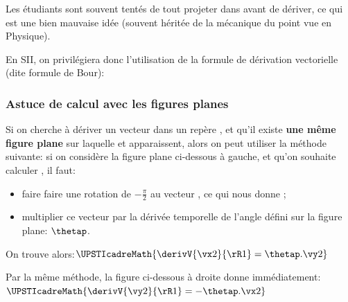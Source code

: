 \documentclass[11pt]{article}
\begin{document}
Les étudiants sont souvent tentés de tout projeter dans  avant de dériver, ce qui est une bien mauvaise idée (souvent héritée de la mécanique du point vue en Physique).

En SII, on privilégiera donc l'utilisation de la formule de dérivation vectorielle (dite \og formule de Bour\fg{}):


\subsubsection{Astuce de calcul avec les figures planes}
Si on cherche à dériver un vecteur  dans un repère , et qu'il existe \textbf{une même figure plane} sur laquelle  et  apparaissent, alors on peut utiliser la méthode suivante: si on considère la figure plane ci-dessous à gauche, et qu'on souhaite calculer , il faut:
\begin{itemize}
\item faire faire une rotation de $-\frac{\pi}{2}$ au vecteur , ce qui nous donne ;
\item multiplier ce vecteur par la dérivée temporelle de l'angle défini sur la figure plane: $\thetap$.
\end{itemize}

On trouve alors:\quad $\UPSTIcadreMath{\derivV{\vx2}{\rR1}=\thetap.\vy2}$

Par la même méthode, la figure  ci-dessous à droite donne immédiatement:\quad $\UPSTIcadreMath{\derivV{\vy2}{\rR1}=-\thetap.\vx2}$
\end{document}
